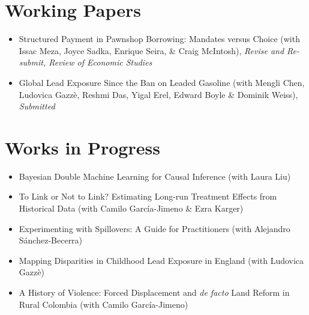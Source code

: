 \documentclass[line,overlapped]{myres}
\begin{document}
\begin{resume}
\section{\sc Working Papers}
\begin{itemize}
  \item Structured Payment in Pawnshop Borrowing: Mandates versus Choice (with Issac Meza, Joyce Sadka, Enrique Seira, \& Craig McIntosh), \emph{Revise and Re-submit, Review of Economic Studies}
  \item Global Lead Exposure Since the Ban on Leaded Gasoline (with Mengli Chen, Ludovica Gazz\`e, Reshmi Das, Yigal Erel, Edward Boyle \& Dominik Weiss), \emph{Submitted}
\end{itemize}


\section{\sc Works in Progress}
\begin{itemize}
  \item Bayesian Double Machine Learning for Causal Inference (with Laura Liu)
  \item To Link or Not to Link? Estimating Long-run Treatment Effects from Historical Data (with Camilo Garc\'{i}a-Jimeno \& Ezra Karger) 
  \item Experimenting with Spillovers: A Guide for Practitioners (with Alejandro S\'anchez-Becerra)
  \item Mapping Disparities in Childhood Lead Exposure in England (with Ludovica Gazz\`e) 
  \item A History of Violence: Forced Displacement and \emph{de facto} Land Reform in Rural Colombia (with Camilo Garc\'{i}a-Jimeno)
\end{itemize}


\end{resume}
\end{document}

